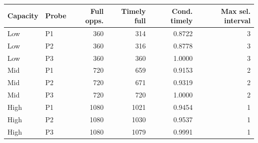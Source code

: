 \begin{tabular}{@{}llrrrr@{}}
\toprule
Capacity & Probe & Full opps. & Timely full & Cond. timely & Max sel. interval \\
\midrule
Low & P1 & 360 & 314 & 0.8722 & 3 \\
Low & P2 & 360 & 316 & 0.8778 & 3 \\
Low & P3 & 360 & 360 & 1.0000 & 3 \\
Mid & P1 & 720 & 659 & 0.9153 & 2 \\
Mid & P2 & 720 & 671 & 0.9319 & 2 \\
Mid & P3 & 720 & 720 & 1.0000 & 2 \\
High & P1 & 1080 & 1021 & 0.9454 & 1 \\
High & P2 & 1080 & 1030 & 0.9537 & 1 \\
High & P3 & 1080 & 1079 & 0.9991 & 1 \\
\bottomrule
\end{tabular}